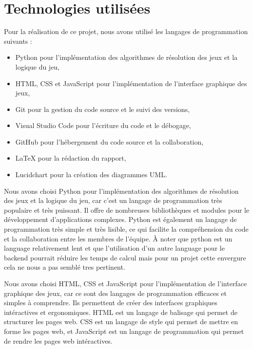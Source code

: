\section{Technologies utilisées}

Pour la réalisation de ce projet, nous avons utilisé les langages de programmation suivants :
\begin{itemize}
	\item Python pour l'implémentation des algorithmes de résolution des jeux et la logique du jeu,
	\item HTML, CSS et JavaScript pour l'implémentation de l'interface graphique des jeux,
	\item Git pour la gestion du code source et le suivi des versions,
	\item Visual Studio Code pour l'écriture du code et le débogage,
	\item GitHub pour l'hébergement du code source et la collaboration,
	\item LaTeX pour la rédaction du rapport,
	\item Lucidchart pour la création des diagrammes UML.
\end{itemize}

Nous avons choisi Python pour l'implémentation des algorithmes de résolution des 
jeux et la logique du jeu, car c'est un langage de programmation très populaire et 
très puissant. Il offre de nombreuses bibliothèques et modules pour le 
développement d'applications complexes. 
Python est également un langage de programmation très simple et très lisible, 
ce qui facilite la compréhension du code et la collaboration entre les membres de 
l'équipe.
À noter que python est un language relativement lent et que l'utilisation d'un autre
language pour le backend pourrait réduire les temps de calcul mais pour un projet cette envergure
cela ne nous a pas semblé tres pertinent.

Nous avons choisi HTML, CSS et JavaScript pour l'implémentation de l'interface
graphique des jeux, car ce sont des langages de programmation efficaces et 
simples à comprendre. Ils permettent de créer des interfaces graphiques intéractives 
et ergonomiques. HTML est un langage de balisage qui permet de structurer les pages
web. CSS est un langage de style qui permet de mettre en forme les pages web, et
JavaScript est un langage de programmation qui permet de rendre les pages web
intéractives.

